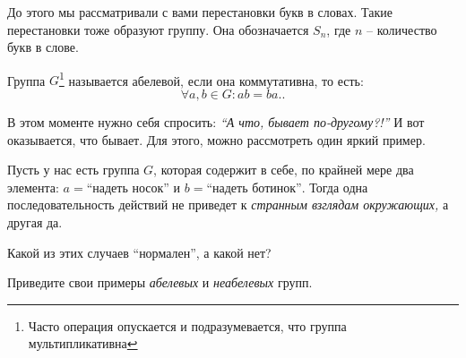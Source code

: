 \begin{example}
    До этого мы рассматривали с вами перестановки букв в словах.
    Такие перестановки тоже образуют группу. Она обозначается $S_n$, 
    где $n$ -- количество букв в слове.
\end{example}


\begin{definition}
    Группа $G$\footnote{Часто операция опускается и подразумевается, что группа мультипликативна} 
    называется абелевой, если она коммутативна, то есть: \[
        \forall a, b \in G: ab = ba.
    .\] 
\end{definition}

В этом моменте нужно себя спросить: \emph{``А что, бывает по-другому?!''} И вот оказывается, что бывает.
Для этого, можно рассмотреть один яркий пример. 
\begin{example}
    Пусть у нас есть группа $G$, которая содержит в себе, по крайней мере два элемента: 
    $a = \text{``надеть носок''}$ и $b = \text{``надеть ботинок''}$.
    Тогда одна последовательность действий не приведет к \emph{странным взглядам окружающих,} а другая да.
\end{example}

\begin{practice}
   Какой из этих случаев ``нормален'', а какой нет? 
\end{practice}
\begin{practice}
    Приведите свои примеры \emph{абелевых} и \emph{неабелевых} групп. 
\end{practice}
